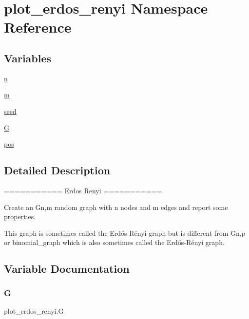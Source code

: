 \hypertarget{namespaceplot__erdos__renyi}{}\section{plot\+\_\+erdos\+\_\+renyi Namespace Reference}
\label{namespaceplot__erdos__renyi}
\subsection*{Variables}
\begin{DoxyCompactItemize}
\item 
\hyperlink{namespaceplot__erdos__renyi_ad39968ccc14a4c81b96c3f9b5fdd4fd7}{n}
\item 
\hyperlink{namespaceplot__erdos__renyi_a8be97e9948f892398e0dbaaeaea296d6}{m}
\item 
\hyperlink{namespaceplot__erdos__renyi_a99788c4c4839724685ad7e852e6ade33}{seed}
\item 
\hyperlink{namespaceplot__erdos__renyi_a22318d1b8348bb5ceee45a6b400d28ea}{G}
\item 
\hyperlink{namespaceplot__erdos__renyi_ab1513ef0b1a580e884e9c04b2d08e8a8}{pos}
\end{DoxyCompactItemize}


\subsection{Detailed Description}
\begin{DoxyVerb}===========
Erdos Renyi
===========

Create an G{n,m} random graph with n nodes and m edges
and report some properties.

This graph is sometimes called the Erdős-Rényi graph
but is different from G{n,p} or binomial_graph which is also
sometimes called the Erdős-Rényi graph.
\end{DoxyVerb}
 

\subsection{Variable Documentation}
\mbox{\label{namespaceplot__erdos__renyi_a22318d1b8348bb5ceee45a6b400d28ea}} 
\subsubsection{\texorpdfstring{G}{G}}
{\footnotesize\ttfamily plot\+\_\+erdos\+\_\+renyi.\+G}

